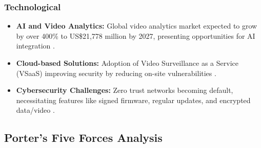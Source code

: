\documentclass{article}
\begin{document}
\subsubsection{Technological}
\begin{itemize}
    \item \textbf{AI and Video Analytics:} Global video analytics market expected to grow by over 400\% to US\$21,778 million by 2027, presenting opportunities for AI integration \cite{aipix2023}.
    \item \textbf{Cloud-based Solutions:} Adoption of Video Surveillance as a Service (VSaaS) improving security by reducing on-site vulnerabilities \cite{aipix2023}.
    \item \textbf{Cybersecurity Challenges:} Zero trust networks becoming default, necessitating features like signed firmware, regular updates, and encrypted data/video \cite{axis2022}.
\end{itemize}



\subsection{Porter's Five Forces Analysis}
\end{document}
